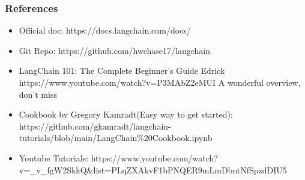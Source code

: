 \begin{frame}[fragile]\frametitle{References}


\begin{itemize}
\item Official doc: https://docs.langchain.com/docs/
\item Git Repo: https://github.com/hwchase17/langchain
\item LangChain 101: The Complete Beginner's Guide Edrick https://www.youtube.com/watch?v=P3MAbZ2eMUI A wonderful overview, don't miss
\item Cookbook by Gregory Kamradt(Easy way to get started): https://github.com/gkamradt/langchain-tutorials/blob/main/LangChain\%20Cookbook.ipynb
\item Youtube Tutorials: https://www.youtube.com/watch?v=\_v\_fgW2SkkQ\&list=PLqZXAkvF1bPNQER9mLmDbntNfSpzdDIU5
\end{itemize}


\end{frame}